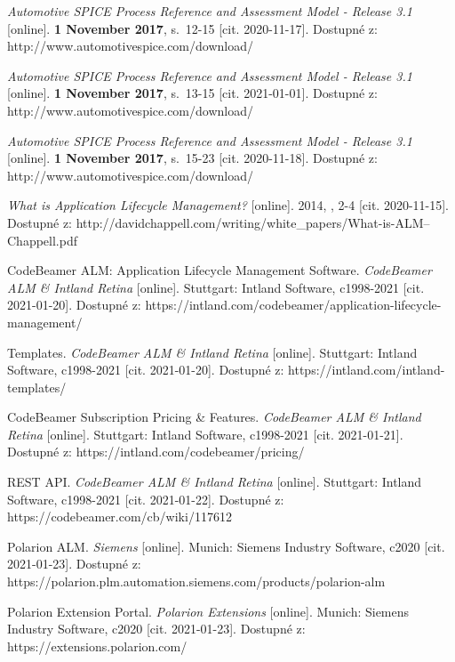 \documentclass[czech,master,public,dept460,male,cpdeclaration,oneside]{diploma}
\begin{document}
\begin{thebibliography}{43}
\textit{Automotive SPICE Process Reference and Assessment Model - Release 3.1} [online]. \textbf{1 November 2017}, s.~12-15 [cit. 2020-11-17]. Dostupné z: http://www.automotivespice.com/download/


\textit{Automotive SPICE Process Reference and Assessment Model - Release 3.1} [online]. \textbf{1 November 2017}, s.~13-15 [cit. 2021-01-01]. Dostupné z: http://www.automotivespice.com/download/

\textit{Automotive SPICE Process Reference and Assessment Model - Release 3.1} [online]. \textbf{1 November 2017}, s.~15-23 [cit. 2020-11-18]. Dostupné z: http://www.automotivespice.com/download/

\textit{What is Application Lifecycle Management?} [online]. 2014, , 2-4 [cit. 2020-11-15]. Dostupné z: http://davidchappell.com/writing/white\_papers/What-is-ALM--Chappell.pdf

CodeBeamer ALM: Application Lifecycle Management Software. \textit{CodeBeamer ALM \& Intland Retina }[online]. Stuttgart: Intland Software, c1998-2021 [cit. 2021-01-20]. Dostupné z: https://intland.com/codebeamer/application-lifecycle-management/

Templates. \textit{CodeBeamer ALM \& Intland Retina} [online]. Stuttgart: Intland Software, c1998-2021 [cit. 2021-01-20]. Dostupné z: https://intland.com/intland-templates/

CodeBeamer Subscription Pricing \& Features. \textit{CodeBeamer ALM \& Intland Retina} [online]. Stuttgart: Intland Software, c1998-2021 [cit. 2021-01-21]. Dostupné z: https://intland.com/codebeamer/pricing/

REST API. \textit{CodeBeamer ALM \& Intland Retina} [online]. Stuttgart: Intland Software, c1998-2021 [cit. 2021-01-22]. Dostupné z: https://codebeamer.com/cb/wiki/117612

Polarion ALM. \textit{Siemens} [online]. Munich: Siemens Industry Software, c2020 [cit. 2021-01-23]. Dostupné z: https://polarion.plm.automation.siemens.com/products/polarion-alm

Polarion Extension Portal. \textit{Polarion Extensions} [online]. Munich: Siemens Industry Software, c2020 [cit. 2021-01-23]. Dostupné z: https://extensions.polarion.com/


\end{thebibliography}
\end{document}
